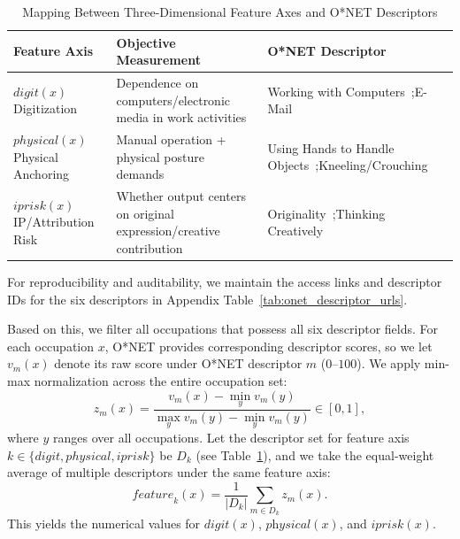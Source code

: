 \begin{table}[H]
\centering
\caption{Mapping Between Three-Dimensional Feature Axes and O*NET Descriptors}
\label{tab:onet_descriptor_mapping}
\begin{tabular}{@{}>{\raggedright\arraybackslash}p{2.8cm} >{\raggedright\arraybackslash}p{5.5cm} >{\raggedright\arraybackslash}p{5.5cm}@{}}
\toprule
\textbf{Feature Axis} & \textbf{Objective Measurement} & \textbf{O*NET Descriptor} \\
\midrule
$digit(x)$\newline Digitization & Dependence on computers/electronic media in work activities & Working with Computers~\cite{onetWorkingWithComputers};\newline E-Mail~\cite{onetEmail} \\
\addlinespace
$physical(x)$\newline Physical Anchoring & Manual operation + physical posture demands & Using Hands to Handle Objects~\cite{onetUsingHands};\newline Kneeling/Crouching~\cite{onetKneeling} \\
\addlinespace
$iprisk(x)$\newline IP/Attribution Risk & Whether output centers on original expression/creative contribution & Originality~\cite{onetOriginality};\newline Thinking Creatively~\cite{onetThinkingCreatively} \\
\bottomrule
\end{tabular}
\end{table}

For reproducibility and auditability, we maintain the access links and descriptor IDs for the six descriptors in Appendix Table~\ref{tab:onet_descriptor_urls}.

Based on this, we filter all occupations that possess all six descriptor fields. For each occupation $x$, O*NET provides corresponding descriptor scores, so we let $v_m(x)$ denote its raw score under O*NET descriptor $m$ ($0$--$100$).
We apply min-max normalization across the entire occupation set:
\begin{equation}
    z_m(x)=\frac{v_m(x)-\min_{y}v_m(y)}{\max_{y}v_m(y)-\min_{y}v_m(y)} \in [0,1],
\end{equation}
where $y$ ranges over all occupations. Let the descriptor set for feature axis $k \in \{digit, physical, iprisk\}$ be $D_k$ (see Table~\ref{tab:onet_descriptor_mapping}), and we take the equal-weight average of multiple descriptors under the same feature axis:
\begin{equation}
    \textit{feature}_k(x) = \frac{1}{|D_k|} \sum_{m \in D_k} z_m(x).
\end{equation}
This yields the numerical values for $\textit{digit}(x)$, $\textit{physical}(x)$, and $\textit{iprisk}(x)$.

